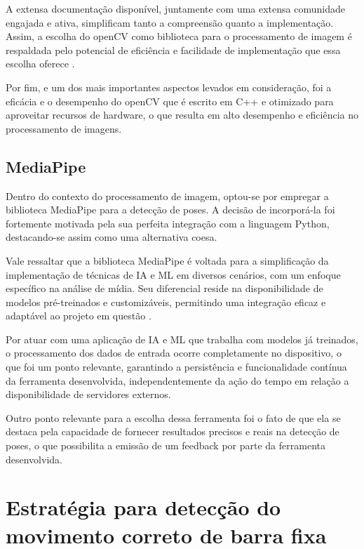 A extensa documentação disponível, juntamente com uma extensa comunidade engajada e ativa, simplificam tanto a compreensão quanto a implementação. Assim, a escolha do \ac{openCV} como biblioteca para o processamento de imagem é respaldada pelo potencial de eficiência e facilidade de implementação que essa escolha oferece \cite{opencv_docs}.

Por fim, e um dos mais importantes aspectos levados em consideração, foi a eficácia e o desempenho do \ac{openCV} que é escrito em C++ e otimizado para aproveitar recursos de hardware, o que resulta em alto desempenho e eficiência no processamento de imagens.

\subsection{MediaPipe}

Dentro do contexto do processamento de imagem, optou-se por empregar a biblioteca MediaPipe para a detecção de poses. A decisão de incorporá-la foi fortemente motivada pela sua perfeita integração com a linguagem Python, destacando-se assim como uma alternativa coesa.

Vale ressaltar que a biblioteca MediaPipe é voltada para a simplificação da implementação de técnicas de \ac{IA} e \ac{ML} em diversos cenários, com um enfoque específico na análise de mídia. Seu diferencial reside na disponibilidade de modelos pré-treinados e customizáveis, permitindo uma integração eficaz e adaptável ao projeto em questão \cite{mediapipe_guide}.

Por atuar com uma aplicação de \ac{IA} e \ac{ML} que trabalha com modelos já treinados, o processamento dos dados de entrada ocorre completamente no dispositivo, o que foi um ponto relevante, garantindo a persistência e funcionalidade contínua da ferramenta desenvolvida, independentemente da ação do tempo em relação a disponibilidade de servidores externos.

Outro ponto relevante para a escolha dessa ferramenta foi o fato de que ela se destaca pela capacidade de fornecer resultados precisos e reais na detecção de poses, o que possibilita a emissão de um feedback por parte da ferramenta desenvolvida.




\section[Estratégia para detecção do movimento correto de barra fixa]{Estratégia para detecção do movimento correto de barra fixa}\label{sec:Estrategia para deteccao do movimento correto de barra fixa}


